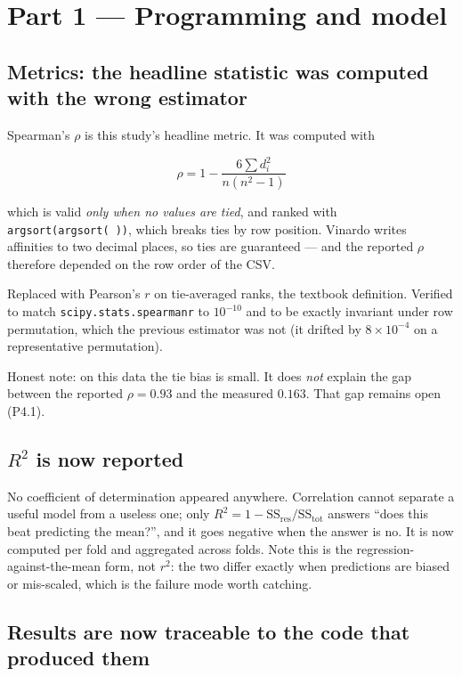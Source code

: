 \documentclass[11pt,a4paper]{article}
\newcommand{\warn}[1]{\textcolor{warnorange}{#1}}
\newcommand{\code}[1]{\texttt{\small #1}}
\begin{document}
\section{Part 1 --- Programming and model}

\subsection{Metrics: the headline statistic was computed with the wrong estimator}

Spearman's $\rho$ is this study's headline metric. It was computed with

\[
  \rho = 1 - \frac{6\sum d_i^2}{n(n^2-1)}
\]

which is valid \emph{only when no values are tied}, and ranked with
\code{argsort(argsort(\,))}, which breaks ties by row position. Vinardo writes
affinities to two decimal places, so ties are guaranteed --- and the reported
$\rho$ therefore depended on the row order of the CSV.

Replaced with Pearson's $r$ on tie-averaged ranks, the textbook definition.
Verified to match \code{scipy.stats.spearmanr} to $10^{-10}$ and to be exactly
invariant under row permutation, which the previous estimator was not (it
drifted by $8\times10^{-4}$ on a representative permutation).

\warn{Honest note:} on this data the tie bias is small. It does \emph{not}
explain the gap between the reported $\rho = 0.93$ and the measured $0.163$.
That gap remains open (P4.1).

\subsection{$R^2$ is now reported}

No coefficient of determination appeared anywhere. Correlation cannot separate
a useful model from a useless one; only
$R^2 = 1 - \mathrm{SS_{res}}/\mathrm{SS_{tot}}$ answers ``does this beat
predicting the mean?'', and it goes negative when the answer is no. It is now
computed per fold and aggregated across folds. Note this is the
regression-against-the-mean form, not $r^2$: the two differ exactly when
predictions are biased or mis-scaled, which is the failure mode worth
catching.

\subsection{Results are now traceable to the code that produced them}
\end{document}
